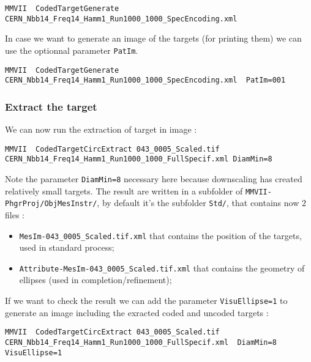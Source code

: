 \begin{lstlisting}
MMVII  CodedTargetGenerate  CERN_Nbb14_Freq14_Hamm1_Run1000_1000_SpecEncoding.xml
\end{lstlisting}

In case we want to generate an image of the targets (for printing them) we can
use the optionnal parameter {\tt PatIm}.

\begin{lstlisting}
MMVII  CodedTargetGenerate  CERN_Nbb14_Freq14_Hamm1_Run1000_1000_SpecEncoding.xml  PatIm=001
\end{lstlisting}


\subsubsection{Extract the target}

We can now run the extraction of target in image :

\begin{lstlisting}
MMVII  CodedTargetCircExtract 043_0005_Scaled.tif CERN_Nbb14_Freq14_Hamm1_Run1000_1000_FullSpecif.xml DiamMin=8
\end{lstlisting}

Note the parameter {\tt DiamMin=8} necessary here because downscaling has created relatively small targets. 
The result are written in a subfolder of {\tt MMVII-PhgrProj/ObjMesInstr/}, by default it's the subfolder
{\tt Std/}, that contains now $2$ files :

\begin{itemize}
	\item {\tt MesIm-043\_0005\_Scaled.tif.xml} that contains the position of the targets, used in standard process;
	\item {\tt Attribute-MesIm-043\_0005\_Scaled.tif.xml} that contains the geometry of ellipses (used in completion/refinement);
\end{itemize}


If we want to check the result we can add the parameter {\tt VisuEllipse=1} to generate an image
including the exracted coded and uncoded targets :


\begin{lstlisting}
MMVII  CodedTargetCircExtract 043_0005_Scaled.tif CERN_Nbb14_Freq14_Hamm1_Run1000_1000_FullSpecif.xml  DiamMin=8 VisuEllipse=1
\end{lstlisting}


